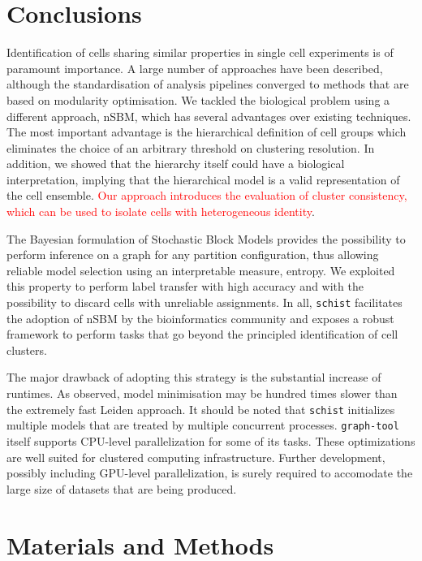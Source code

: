 \documentclass[10pt]{article}
\begin{document}
\section*{Conclusions}

Identification of cells sharing similar properties in single cell experiments is of paramount importance. A large number of approaches have been described, although the standardisation of analysis pipelines converged to methods that are based on modularity optimisation. We tackled the biological problem using a different approach, nSBM, which has several advantages over existing techniques. The most important advantage is the hierarchical definition of cell groups which eliminates the choice of an arbitrary threshold on clustering resolution. In addition, we showed that the hierarchy itself could have a biological interpretation, implying that the hierarchical model is a valid representation of the cell ensemble. \textcolor{red}{Our approach introduces the evaluation of cluster consistency, which can be used to isolate cells with heterogeneous identity}. 

The Bayesian formulation of Stochastic Block Models provides the possibility to perform inference on a graph for any partition configuration, thus allowing reliable model selection using an interpretable measure, entropy. We exploited this property to perform label transfer with high accuracy and with the possibility to discard cells with unreliable assignments. In all, \texttt{schist} facilitates the adoption of nSBM by the bioinformatics community and exposes a robust framework to perform tasks that go beyond the principled identification of cell clusters. 

The major drawback of adopting this strategy is the substantial increase of runtimes. As observed, model minimisation may be hundred times slower than the extremely fast Leiden approach. It should be noted that \texttt{schist} initializes multiple models that are treated by multiple concurrent processes. \texttt{graph-tool} itself supports CPU-level parallelization for some of its tasks. These optimizations are well suited for clustered computing infrastructure. Further development, possibly including GPU-level parallelization, is surely required to accomodate the large size of datasets that are being produced.

\section*{Materials and Methods}
\end{document}
